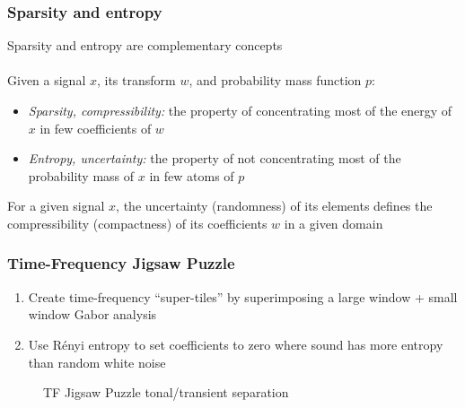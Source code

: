 \documentclass[usenames,dvipsnames]{beamer}
\begin{document}
\begin{frame}
	\frametitle{Sparsity and entropy} 
	Sparsity and entropy are complementary concepts\\\ \\
	Given a signal $x$, its transform $w$, and probability mass function $p$:
	\begin{itemize}
		\item
			\textit{Sparsity, compressibility:} the property of concentrating most of the energy of $x$ in few coefficients of $w$
		\item
			\textit{Entropy, uncertainty:} the property of not concentrating most of the probability mass of $x$ in few atoms of $p$
	\end{itemize}
	For a given signal $x$, the uncertainty (randomness) of its elements defines the compressibility (compactness) of its coefficients $w$ in a given domain\\

\end{frame}

\begin{frame}
	\frametitle{Time-Frequency Jigsaw Puzzle}
	\begin{enumerate}
		\item
			Create time-frequency ``super-tiles'' by superimposing a large window + small window Gabor analysis
		\item
			Use R{\'e}nyi entropy to set coefficients to zero where sound has more entropy than random white noise
	\end{enumerate}
	\begin{figure}[ht]
		\vspace{-0.75em}
		\hspace{0.1em}
		\caption{TF Jigsaw Puzzle tonal/transient separation}
	\end{figure}
\end{frame}
\end{document}
